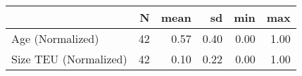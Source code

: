 
\begin{tabular}[t]{lrrrrr}
\toprule
  & N & mean & sd & min & max\\
\midrule
Age (Normalized) & 42 & 0.57 & 0.40 & 0.00 & 1.00\\
Size TEU (Normalized) & 42 & 0.10 & 0.22 & 0.00 & 1.00\\
\bottomrule
\end{tabular}
